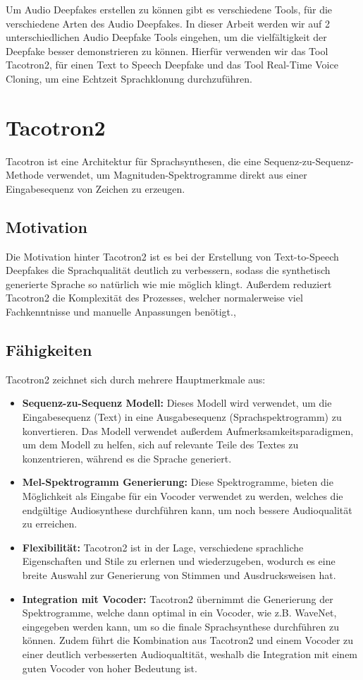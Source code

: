 Um Audio Deepfakes erstellen zu können gibt es verschiedene Tools, für die verschiedene Arten des Audio Deepfakes.
In dieser Arbeit werden wir auf 2 unterschiedlichen Audio Deepfake Tools eingehen, um die vielfältigkeit der Deepfake besser demonstrieren zu können.
Hierfür verwenden wir das Tool Tacotron2, für einen Text to Speech Deepfake und das Tool Real-Time Voice Cloning, um eine Echtzeit Sprachklonung durchzuführen.

\section{Tacotron2}
Tacotron ist eine Architektur für Sprachsynthesen, die eine \gls{Sequenz-zu-Sequenz-Methode} verwendet, um \gls{Magnituden-Spektrogramme} direkt aus einer Eingabesequenz von Zeichen zu erzeugen.

\subsection{Motivation}
Die Motivation hinter Tacotron2 ist es bei der Erstellung von Text-to-Speech Deepfakes die Sprachqualität deutlich zu verbessern, sodass die synthetisch generierte Sprache so natürlich wie mie möglich klingt.
Außerdem reduziert Tacotron2 die Komplexität des Prozesses, welcher normalerweise viel Fachkenntnisse und manuelle Anpassungen benötigt.\cite{Arxiv},\cite{Arxiv2}

\subsection{Fähigkeiten}
Tacotron2 zeichnet sich durch mehrere Hauptmerkmale aus:
\begin{itemize}
    \item \textbf{Sequenz-zu-Sequenz Modell:} Dieses Modell wird verwendet, um die Eingabesequenz (Text) in eine Ausgabesequenz (Sprachspektrogramm) zu konvertieren. Das Modell verwendet außerdem Aufmerksamkeitsparadigmen, um dem Modell zu helfen, sich auf relevante Teile des Textes zu konzentrieren, während es die Sprache generiert.\cite{Arxiv2}
    \item \textbf{Mel-Spektrogramm Generierung:} Diese Spektrogramme, bieten die Möglichkeit als Eingabe für ein Vocoder verwendet zu werden, welches die endgültige Audiosynthese durchführen kann, um noch bessere Audioqualität zu erreichen.\cite{Arxiv}
    \item \textbf{Flexibilität:} Tacotron2 ist in der Lage, verschiedene sprachliche Eigenschaften und Stile zu erlernen und wiederzugeben, wodurch es eine breite Auswahl zur Generierung von Stimmen und Ausdrucksweisen hat.\cite{Arxiv}
    \item \textbf{Integration mit Vocoder:} Tacotron2 übernimmt die Generierung der Spektrogramme, welche dann optimal in ein Vocoder, wie z.B. WaveNet, eingegeben werden kann, um so die finale Sprachsynthese durchführen zu können. Zudem führt die Kombination aus Tacotron2 und einem Vocoder zu einer deutlich verbesserten Audioqualtität, weshalb die Integration mit einem guten Vocoder von hoher Bedeutung ist. \cite{Arxiv}
\end{itemize}

